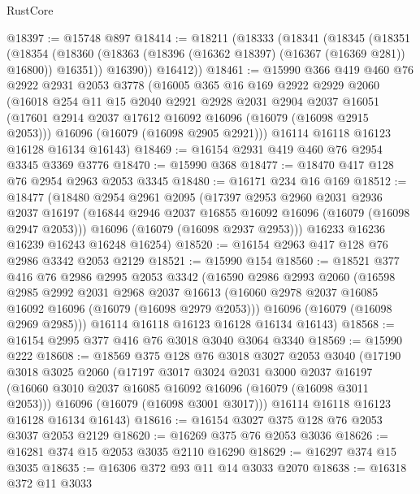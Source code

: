 \begin{lexlean}{RustCore}
\begin{coremodule}
@18397 := @15748 @897
@18414 := @18211
    (@18333
      (@18341
        (@18345
          (@18351
            (@18354 (@18360 (@18363 (@18396 (@16362 @18397) (@16367 (@16369 @281)) @16800)) @16351))
            @16390))
        @16412))
@18461 := @15990
    @366
    @419
    @460
    @76
    @2922
    @2931
    @2053
    @3778
    (@16005
      @365
      @16
      @169
      @2922
      @2929
      @2060
      (@16018
        @254
        @11
        @15
        @2040
        @2921
        @2928
        @2031
        @2904
        @2037
        @16051
        (@17601 @2914 @2037 @17612 @16092 @16096 (@16079 (@16098 @2915 @2053)))
        @16096
        (@16079 (@16098 @2905 @2921)))
      @16114
      @16118
      @16123
      @16128
      @16134
      @16143)
@18469 := @16154 @2931 @419 @460 @76 @2954 @3345 @3369 @3776
@18470 := @15990 @368
@18477 := @18470 @417 @128 @76 @2954 @2963 @2053 @3345
@18480 := @16171 @234 @16 @169
@18512 := @18477
    (@18480
      @2954
      @2961
      @2095
      (@17397
        @2953
        @2960
        @2031
        @2936
        @2037
        @16197
        (@16844 @2946 @2037 @16855 @16092 @16096 (@16079 (@16098 @2947 @2053)))
        @16096
        (@16079 (@16098 @2937 @2953)))
      @16233
      @16236
      @16239
      @16243
      @16248
      @16254)
@18520 := @16154 @2963 @417 @128 @76 @2986 @3342 @2053 @2129
@18521 := @15990 @154
@18560 := @18521
    @377
    @416
    @76
    @2986
    @2995
    @2053
    @3342
    (@16590
      @2986
      @2993
      @2060
      (@16598
        @2985
        @2992
        @2031
        @2968
        @2037
        @16613
        (@16060 @2978 @2037 @16085 @16092 @16096 (@16079 (@16098 @2979 @2053)))
        @16096
        (@16079 (@16098 @2969 @2985)))
      @16114
      @16118
      @16123
      @16128
      @16134
      @16143)
@18568 := @16154 @2995 @377 @416 @76 @3018 @3040 @3064 @3340
@18569 := @15990 @222
@18608 := @18569
    @375
    @128
    @76
    @3018
    @3027
    @2053
    @3040
    (@17190
      @3018
      @3025
      @2060
      (@17197
        @3017
        @3024
        @2031
        @3000
        @2037
        @16197
        (@16060 @3010 @2037 @16085 @16092 @16096 (@16079 (@16098 @3011 @2053)))
        @16096
        (@16079 (@16098 @3001 @3017)))
      @16114
      @16118
      @16123
      @16128
      @16134
      @16143)
@18616 := @16154 @3027 @375 @128 @76 @2053 @3037 @2053 @2129
@18620 := @16269 @375 @76 @2053 @3036
@18626 := @16281 @374 @15 @2053 @3035 @2110 @16290
@18629 := @16297 @374 @15 @3035
@18635 := @16306 @372 @93 @11 @14 @3033 @2070
@18638 := @16318 @372 @11 @3033

\end{coremodule}
\end{lexlean}
